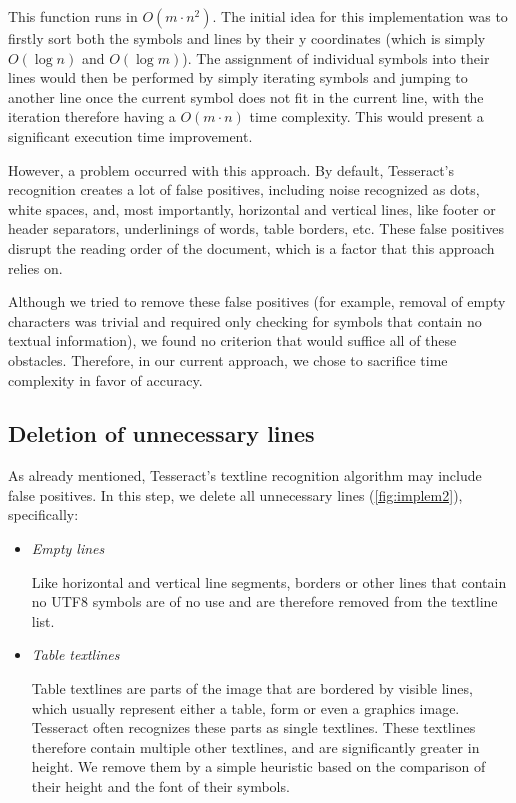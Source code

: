 This function runs in $O(m\cdot n^2)$. The initial idea for this implementation was to firstly sort both the symbols and lines by their y coordinates (which is simply $O(\log n)$ and $O(\log m)$). The assignment of individual symbols into their lines would then be performed by simply iterating symbols and jumping to another line once the current symbol does not fit in the current line, with the iteration therefore having a $O(m\cdot n)$ time complexity. This would present a significant execution time improvement.

However, a problem occurred with this approach. By default, Tesseract's recognition creates a lot of false positives, including noise recognized as dots, white spaces, and, most importantly, horizontal and vertical lines, like footer or header separators, underlinings of words, table borders, etc. These false positives disrupt the reading order of the document, which is a factor that this approach relies on.

Although we tried to remove these false positives (for example, removal of empty characters was trivial and required only checking for symbols that contain no textual information), we found no criterion that would suffice all of these obstacles. Therefore, in our current approach, we chose to sacrifice time complexity in favor of accuracy.

\subsection{Deletion of unnecessary lines}

As already mentioned, Tesseract's textline recognition algorithm may include false positives. In this step, we delete all unnecessary lines (\cref{fig:implem2}), specifically:

\begin{itemize}
\item \emph{Empty lines}

Like horizontal and vertical line segments, borders or other lines that contain no UTF8 symbols are of no use and are therefore removed from the textline list.

\item \emph{Table textlines}

Table textlines are parts of the image that are bordered by visible lines, which usually represent either a table, form or even a graphics image. Tesseract often recognizes these parts as single textlines. These textlines therefore contain multiple other textlines, and are significantly greater in height. We remove them by a simple heuristic based on the comparison of their height and the font of their symbols.
\end{itemize}

